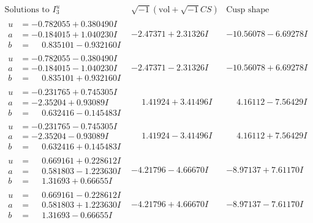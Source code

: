 \documentclass[1p]{elsarticle_modified}
\theoremstyle{definition}
\newcommand{\I}{\sqrt{-1}}
\begin{document}
$$\begin{array}{c|c|c}  
\text{Solutions to }I^u_{3}& \I (\text{vol} + \sqrt{-1}CS) & \text{Cusp shape}\\
 \hline 
\begin{aligned}
u &= -0.782055 + 0.380490 I \\
a &= -0.184015 + 1.040230 I \\
b &= \phantom{-}0.835101 - 0.932160 I\end{aligned}
 & -2.47371 + 2.31326 I & -10.56078 - 6.69278 I \\ \hline\begin{aligned}
u &= -0.782055 - 0.380490 I \\
a &= -0.184015 - 1.040230 I \\
b &= \phantom{-}0.835101 + 0.932160 I\end{aligned}
 & -2.47371 - 2.31326 I & -10.56078 + 6.69278 I \\ \hline\begin{aligned}
u &= -0.231765 + 0.745305 I \\
a &= -2.35204 + 0.93089 I \\
b &= \phantom{-}0.632416 - 0.145483 I\end{aligned}
 & \phantom{-}1.41924 + 3.41496 I & \phantom{-}4.16112 - 7.56429 I \\ \hline\begin{aligned}
u &= -0.231765 - 0.745305 I \\
a &= -2.35204 - 0.93089 I \\
b &= \phantom{-}0.632416 + 0.145483 I\end{aligned}
 & \phantom{-}1.41924 - 3.41496 I & \phantom{-}4.16112 + 7.56429 I \\ \hline\begin{aligned}
u &= \phantom{-}0.669161 + 0.228612 I \\
a &= \phantom{-}0.581803 - 1.223630 I \\
b &= \phantom{-}1.31693 + 0.66655 I\end{aligned}
 & -4.21796 - 4.66670 I & -8.97137 + 7.61170 I \\ \hline\begin{aligned}
u &= \phantom{-}0.669161 - 0.228612 I \\
a &= \phantom{-}0.581803 + 1.223630 I \\
b &= \phantom{-}1.31693 - 0.66655 I\end{aligned}
 & -4.21796 + 4.66670 I & -8.97137 - 7.61170 I \\ \hline\begin{aligned}

\end{aligned}
\end{array}$$
\end{document}
